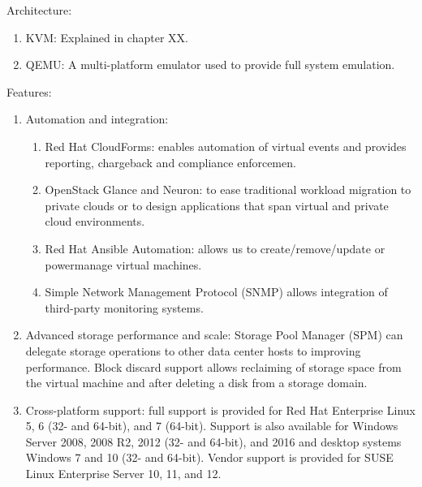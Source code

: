 Architecture:
\begin{enumerate}
\item KVM: Explained in chapter XX.
\item QEMU: A multi-platform emulator used to provide full system emulation.
\end{enumerate}

Features:
\begin{enumerate}
\item Automation and integration:
\begin{enumerate}
\item Red Hat CloudForms: enables automation of virtual events and provides reporting, chargeback and compliance enforcemen.
\item OpenStack Glance and Neuron: to ease traditional workload migration to private clouds or to design applications that span virtual and private cloud environments.
\item Red Hat Ansible Automation: allows us to create/remove/update or powermanage virtual machines.
\item Simple Network Management Protocol (SNMP) allows integration of third-party monitoring systems.
\end{enumerate}
\item Advanced storage performance and scale: Storage Pool Manager (SPM) can delegate storage operations to other data center hosts to improving performance. Block discard support allows reclaiming of storage space from the virtual machine and after deleting a disk from a storage domain.
\item Cross-platform support: full support is provided for Red Hat Enterprise Linux 5, 6 (32- and 64-bit), and 7 (64-bit). Support is also available for Windows Server 2008, 2008 R2, 2012 (32- and 64-bit), and 2016 and desktop systems Windows 7 and 10 (32- and 64-bit). Vendor support is provided for SUSE Linux Enterprise Server 10, 11, and 12.
\end{enumerate}




